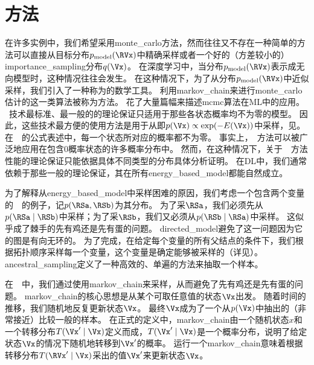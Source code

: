 \section{方法}
\label{sec:markov_chain_monte_carlo_methods}

在许多实例中，我们希望采用\gls{monte_carlo}方法，然而往往又不存在一种简单的方法可以直接从目标分布$p_{\text{model}}(\RVx)$中精确采样或者一个好的（方差较小的）\gls{importance_sampling}分布$q(\Vx)$。 
在深度学习中，当分布$p_{\text{model}}(\RVx)$表示成无向模型时，这种情况往往会发生。
在这种情况下，为了从分布$p_{\text{model}}(\RVx)$中近似采样，我们引入了一种称为的数学工具。
利用\gls{markov_chain}来进行\gls{monte_carlo}估计的这一类算法被称为方法。
\citet{koller-book2009}花了大量篇幅来描述\gls{mcmc}算法在\gls{ML}中的应用。
~技术最标准、最一般的的理论保证只适用于那些各状态概率均不为零的模型。
因此，这些技术最方便的使用方法是用于从即$p(\Vx)\propto \exp(-E(\Vx))$中采样，见。
在~~的公式表述中，每一个状态所对应的概率都不为零。
事实上，~方法可以被广泛地应用在包含$0$概率状态的许多概率分布中。
然而，在这种情况下，关于~~方法性能的理论保证只能依据具体不同类型的分布具体分析证明。
在\gls{DL}中，我们通常依赖于那些一般的理论保证，其在所有\gls{energy_based_model}都能自然成立。



为了解释从\gls{energy_based_model}中采样困难的原因，我们考虑一个包含两个变量的~~的例子，记$p(\RSa,\RSb)$为其分布。  
为了采$\RSa$，我们必须先从$p(\RSa\mid \RSb)$中采样；为了采$\RSb$，我们又必须从$p(\RSb\mid \RSa)$中采样。   
这似乎成了棘手的先有鸡还是先有蛋的问题。
\gls{directed_model}避免了这一问题因为它的图是有向无环的。
为了完成，在给定每个变量的所有父结点的条件下，我们根据拓扑顺序采样每一个变量，这个变量是确定能够被采样的（详见）。   
\gls{ancestral_sampling}定义了一种高效的、单遍的方法来抽取一个样本。   


在~~中，我们通过使用\gls{markov_chain}来采样，从而避免了先有鸡还是先有蛋的问题。  
\gls{markov_chain}的核心思想是从某个可取任意值的状态$\Vx$出发。
随着时间的推移，我们随机地反复更新状态$\Vx$。  
最终$\Vx$成为了一个从$p(\Vx)$中抽出的（非常接近）比较一般的样本。  %
在正式的定义中，\gls{markov_chain}由一个随机状态$x$和一个转移分布$T(\Vx'\mid \Vx)$定义而成，$T(\Vx'\mid \Vx)$是一个概率分布，说明了给定状态$\Vx$的情况下随机地转移到$\Vx'$的概率。
运行一个\gls{markov_chain}意味着根据转移分布$T(\RVx' \mid \Vx)$采出的值$\Vx'$来更新状态$\Vx$。  



